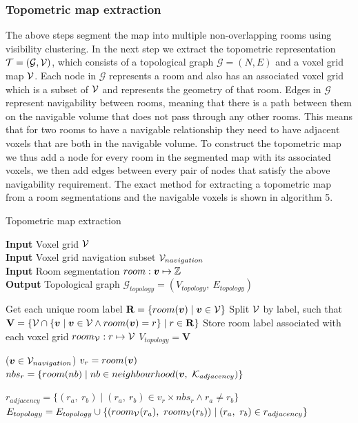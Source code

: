 \subsubsection{Topometric map extraction}
The above steps segment the map into multiple non-overlapping rooms using visibility clustering. In the next step we extract the topometric representation \(\mathcal{T} = (\mathcal{G}, \mathcal{V})\), which consists of a topological graph \(\mathcal{G}=(N,E)\) and a voxel grid map \(\mathcal{V}\). Each node in \(\mathcal{G}\) represents a room and also has an associated voxel grid which is a subset of \(\mathcal{V}\) and represents the geometry of that room. Edges in \(\mathcal{G}\) represent navigability between rooms, meaning that there is a path between them on the navigable volume that does not pass through any other rooms. This means that for two rooms to have a navigable relationship they need to have adjacent voxels that are both in the navigable volume. To construct the topometric map we thus add a node for every room in the segmented map with its associated voxels, we then add edges between every pair of nodes that satisfy the above navigability requirement. The exact method for extracting a topometric map from a room segmentations and the navigable voxels is shown in algorithm 5.

\begin{algorithm}
    \caption{Topometric map extraction}
    \hspace*{\algorithmicindent} \textbf{Input} Voxel grid \(\mathcal{V}\) \\
    \hspace*{\algorithmicindent} \textbf{Input} Voxel grid navigation subset \(\mathcal{V}_{navigation}\) \\
    \hspace*{\algorithmicindent} \textbf{Input} Room segmentation \(room: \boldsymbol{v} \mapsto \mathbb{Z}\) \\
    \hspace*{\algorithmicindent} \textbf{Output} Topological graph \(\mathcal{G}_{topology} = (V_{topology},\ E_{topology})\) \\

    \begin{algorithmic}
    \label{algo:topo_extract}
    \State Get each unique room label \(\mathbf{R} = \{room(\boldsymbol{v}) \mid \boldsymbol{v} \in \mathcal{V}\}\)
    \State Split \(\mathcal{V}\) by label, such that \(\mathbf{V} = \{\mathcal{V} \cap \{\boldsymbol{v} \mid \boldsymbol{v} \in \mathcal{V} \land room(\boldsymbol{v}) = r\} \mid r \in \mathbf{R}\}\)
    \State Store room label associated with each voxel grid \(room_{\mathcal{V}}: r \mapsto \mathcal{V}\)
    \State $V_{topology} = \mathbf{V}$

    \ForEach($\boldsymbol{v} \in \mathcal{V}_{navigation}$)
        \State $v_r = room(\boldsymbol{v})$
        \State $nbs_r = \{room(nb) \mid nb \in neighbourhood(\boldsymbol{v},\ \mathcal{K}_{adjacency})\}$

        \State $r_{adjacency} = \{(r_a,\ r_b) \mid (r_a,\ r_b) \in {v_r} \times {nbs_r} \land r_a \neq r_b\}$
        \State $E_{topology} = E_{topology} \cup \{(room_{\mathcal{V}}(r_a),\ room_{\mathcal{V}}(r_b)) \mid (r_a,\ r_b) \in r_{adjacency}\}$
    \EndFor
    \end{algorithmic}
\end{algorithm}